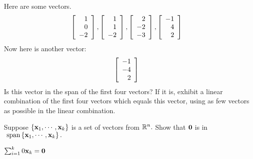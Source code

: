 \begin{enumialphparenastyle}
\begin{ex} Here are some vectors. 
\begin{equation*}
\left[ 
\begin{array}{r}
1 \\ 
0 \\ 
-2
\end{array}
\right] ,\left[ 
\begin{array}{r}
1 \\ 
1 \\ 
-2
\end{array}
\right] ,\left[ 
\begin{array}{r}
2 \\ 
-2 \\ 
-3
\end{array}
\right] ,\left[ 
\begin{array}{r}
-1 \\ 
4 \\ 
2
\end{array}
\right]
\end{equation*}
Now here is another vector:\ 
\begin{equation*}
\left[ 
\begin{array}{r}
-1 \\ 
-4 \\ 
2
\end{array}
\right] 
\end{equation*}
Is this vector in the span of the first four vectors? If it is, exhibit a
linear combination of the first four vectors which equals this vector, using
as few vectors as possible in the linear combination.
\end{ex}


\begin{ex} Suppose $\left\{ {\bf x}_{1},\cdots ,{\bf x}_{k}\right\} $ is a
set of vectors from $\mathbb{R}^{n}.$ Show that ${\bf 0}$ is in $\mbox{
span}\left\{ {\bf x}_{1},\cdots ,{\bf x}_{k}\right\} .$
\begin{sol}
$\sum_{i=1}^{k}0{\bf x}_{k}={\bf 0}$
\end{sol}
\end{ex}

\end{enumialphparenastyle}